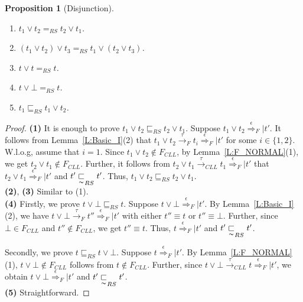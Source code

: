 \documentclass{elsarticle}
\theoremstyle{plain}
\newtheorem{proposition}[theorem]{Proposition}
\theoremstyle{definition}
\begin{document}
\begin{proposition}[Disjunction]\label{S:DISJUNCTION}\hfill
    \begin{enumerate}
      \item $t_1 \vee t_2 =_{RS} t_2 \vee t_1$.
      \item $(t_1 \vee t_2) \vee t_3 =_{RS} t_1 \vee (t_2 \vee t_3)$.
      \item $t \vee t =_{RS} t$.
      \item $t \vee \bot =_{RS} t$.
      \item $t_1 \sqsubseteq_{RS} t_1 \vee t_2$.
    \end{enumerate}
\end{proposition}
\begin{proof}
\noindent \textbf{(1)} It is enough to prove $t_1 \vee t_2 \sqsubseteq_{RS} t_2 \vee t_1$.
    Suppose $t_1 \vee t_2 \stackrel{\epsilon}{\Longrightarrow}_F| t'$.
    It follows from Lemma~\ref{L:Basic_I}(2) that $t_1 \vee t_2 \stackrel{\tau}{\longrightarrow}_F t_i \stackrel{\epsilon}{\Longrightarrow}_F| t'$ for some $i\in \{1,2\}$.
    W.l.o.g, assume that $i=1$.
    Since $t_1 \vee t_2 \notin F_{{CLL}}$, by Lemma~\ref{L:F_NORMAL}(1), we get $t_2 \vee t_1 \notin F_{{CLL}}$.
    Further, it follows from $t_2 \vee t_1 \stackrel{\tau}{\longrightarrow}_{{CLL}}t_1 \stackrel{\epsilon}{\Longrightarrow}_F| t'$ that $t_2 \vee t_1 \stackrel{\epsilon}{\Longrightarrow}_F| t'$ and $t'\underset{\thicksim}{\sqsubset}_{RS} t'$. Thus,  $t_1 \vee t_2 \sqsubseteq_{RS} t_2 \vee t_1$.\\

\noindent \textbf{(2)}, \textbf{(3)} Similar to (1).\\

\noindent \textbf{(4)} Firstly, we prove $t \vee \bot \sqsubseteq_{RS} t$.
Suppose $t \vee \bot \stackrel{\epsilon}{\Longrightarrow}_F| t'$.
By Lemma~\ref{L:Basic_I}(2), we have $t \vee \bot \stackrel{\tau}{\longrightarrow}_F t'' \stackrel{\epsilon}{\Longrightarrow}_F| t'$ with either $t''\equiv t$ or $t'' \equiv \bot$. Further, since $\bot \in F_{{CLL}}$ and $t'' \notin F_{CLL}$, we get $t'' \equiv t$.
    Thus, $t \stackrel{\epsilon}{\Longrightarrow}_F| t'$ and $t'\underset{\thicksim}{\sqsubset}_{RS} t'$.

Secondly, we prove $t \sqsubseteq_{RS} t \vee \bot$.
    Suppose  $t \stackrel{\epsilon}{\Longrightarrow}_F| t'$.
    By Lemma~\ref{L:F_NORMAL}(1), $t \vee \bot \notin F_{{CLL}}$ follows from $t \notin F_{{CLL}}$.
    Further, since $t \vee \bot \stackrel{\tau}{\longrightarrow}_{{CLL}} t \stackrel{\epsilon}{\Longrightarrow}_F| t'$,
    we obtain $t \vee \bot \stackrel{\epsilon}{\Longrightarrow}_F| t'$ and $t'\underset{\thicksim}{\sqsubset}_{RS} t'$.\\

\noindent \textbf{(5)} Straightforward.
\end{proof}
\end{document}
